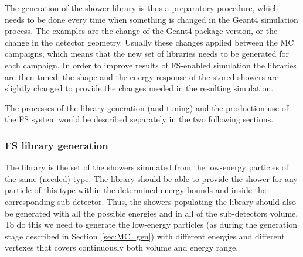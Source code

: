 \begin{figure}
\end{figure}

The generation of the shower library is thus a preparatory procedure, which needs to be done every time when something is changed in the Geant4 simulation process. The examples are the change of the Geant4 package version, or the change in the detector geometry. Usually these changes applied between the MC campaigns, which means that the new set of libraries needs to be generated for each campaign. In order to improve results of FS-enabled simulation the libraries are then tuned: the shape and the energy response of the stored showers are slightly changed to provide the changes needed in the resulting simulation.

The processes of the library generation (and tuning) and the production use of the FS system would be described separately in the two following sections.

\subsubsection{FS library generation}
\label{sec:MC_FS_gen}

The library is the set of the showers simulated from the low-energy particles of the same (needed) type. The library should be able to provide the shower for any particle of this type within the determined energy bounds and inside the corresponding sub-detector. Thus, the showers populating the library should also be generated with all the possible energies and in all of the sub-detectors volume. To do this we need to generate the low-energy particles (as during the generation stage described in Section~\ref{sec:MC_gen}) with different energies and different vertexes that covers continuously both volume and energy range.

